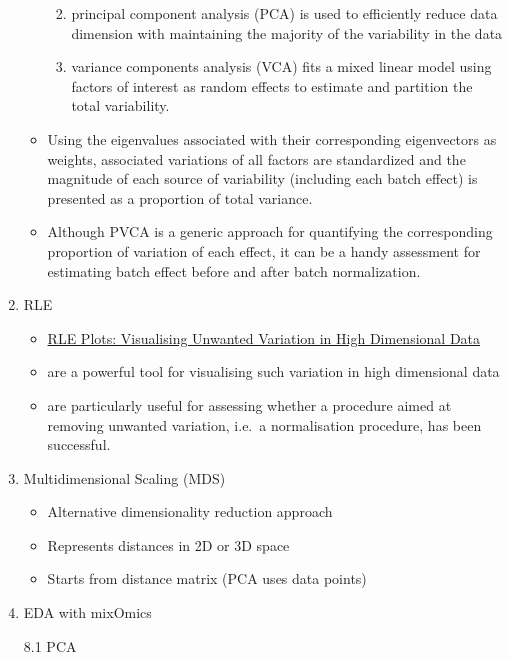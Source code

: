 \documentclass[
]{book}
\begin{document}
\begin{enumerate}
\begin{itemize}
    \begin{enumerate}
    \def\labelenumii{\arabic{enumii}.}
    \item
      principal component analysis (PCA) is used to efficiently reduce data dimension with maintaining the majority of the variability in the data
    \item
      variance components analysis (VCA) fits a mixed linear model using factors of interest as random effects to estimate and partition the total variability.
    \end{enumerate}
  \item
    Using the eigenvalues associated with their corresponding eigenvectors as weights, associated variations of all factors are standardized and the magnitude of each source of variability (including each batch effect) is presented as a proportion of total variance.
  \item
    Although PVCA is a generic approach for quantifying the corresponding proportion of variation of each effect, it can be a handy assessment for estimating batch effect before and after batch normalization.
  \end{itemize}
\item
  RLE

  \begin{itemize}
  \item
    \href{https://arxiv.org/pdf/1704.03590.pdf}{RLE Plots: Visualising Unwanted Variation in High Dimensional Data}
  \item
    are a powerful tool for visualising such variation in high dimensional data
  \item
    are particularly useful for assessing whether a procedure aimed at removing unwanted variation, i.e.~a normalisation procedure, has been successful.
  \end{itemize}
\item
  Multidimensional Scaling (MDS)

  \begin{itemize}
  \item
    Alternative dimensionality reduction approach
  \item
    Represents distances in 2D or 3D space
  \item
    Starts from distance matrix (PCA uses data points)
  \end{itemize}
\item
  EDA with mixOmics

  8.1 PCA


\end{enumerate}
\end{document}
